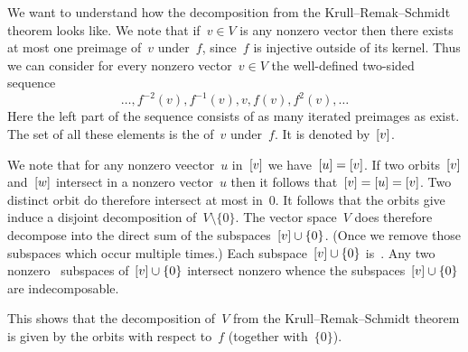 \documentclass[a4paper,11pt]{scrartcl}
\begin{document}
We want to understand how the decomposition from the Krull--Remak--Schmidt theorem looks like.
We note that if~$v \in V$ is any nonzero vector then there exists at most one preimage of~$v$ under~$f$, since~$f$ is injective outside of its kernel.
Thus we can consider for every nonzero vector~$v \in V$ the well-defined two-sided sequence
\[
  \dotsc, f^{-2}(v), f^{-1}(v), v, f(v), f^2(v), \dotsc
\]
Here the left part of the sequence consists of as many iterated preimages as exist.
The set of all these elements is the  of~$v$ under~$f$.
It is denoted by~$[v]$.

We note that for any nonzero veector~$u$ in~$[v]$ we have~$[u] = [v]$.
If two orbits~$[v]$ and~$[w]$ intersect in a nonzero vector~$u$ then it follows that~$[v] = [u] = [v]$.
Two distinct orbit do therefore intersect at most in~$0$.
It follows that the orbits give induce a disjoint decomposition of~$V \setminus \{0\}$.
The vector space~$V$ does therefore decompose into the direct sum of the subspaces~$[v] \cup \{ 0 \}$.
(Once we remove those subspaces which occur multiple times.)
Each subspace~$[v] \cup \{ 0 \}$ is~.
Any two nonzero~ subspaces of~$[v] \cup \{ 0 \}$ intersect nonzero whence the subspaces~$[v] \cup \{ 0 \}$ are indecomposable.

This shows that the decomposition of~$V$ from the Krull--Remak--Schmidt theorem is given by the orbits with respect to~$f$ (together with~$\{ 0 \}$).
\end{document}
